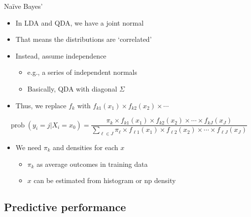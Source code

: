 \documentclass[
  ignorenonframetext,
]{beamer}
\providecommand{\tightlist}{%
  \setlength{\itemsep}{0pt}\setlength{\parskip}{0pt}}
\DeclareMathOperator{\prob}{prob}
\begin{document}
\begin{frame}{Naïve Bayes'}
\protect{}\label{nauxefve-bayes}
\begin{itemize}
\tightlist
\item
  In LDA and QDA, we have a joint normal
\item
  That means the distributions are `correlated'
\item
  Instead, assume independence

  \begin{itemize}
  \tightlist
  \item
    e.g., a series of independent normals
  \item
    Basically, QDA with diagonal \(\Sigma\)
  \end{itemize}
\item
  Thus, we replace \(f_k\) with
  \(f_{k1}(x_1) \times f_{k2}(x_2) \times \cdots\)
\end{itemize}

\[
\prob(y_i = j | X_i = x_0) = \frac{\pi_k \times f_{k1}(x_1) \times f_{k2}(x_2) \times \cdots \times f_{kJ}(x_J)} {\sum_{\ell \in J} \pi_\ell \times f_{\ell1}(x_1) \times f_{\ell2}(x_2) \times \cdots \times f_{\ell J}(x_J)}
\]

\begin{itemize}
\tightlist
\item
  We need \(\pi_k\) and densities for each \(x\)

  \begin{itemize}
  \tightlist
  \item
    \(\pi_k\) as average outcomes in training data
  \item
    \(x\) can be estimated from histogram or np density
  \end{itemize}
\end{itemize}
\end{frame}

\subsection{Predictive performance}\label{predictive-performance}
\end{document}
